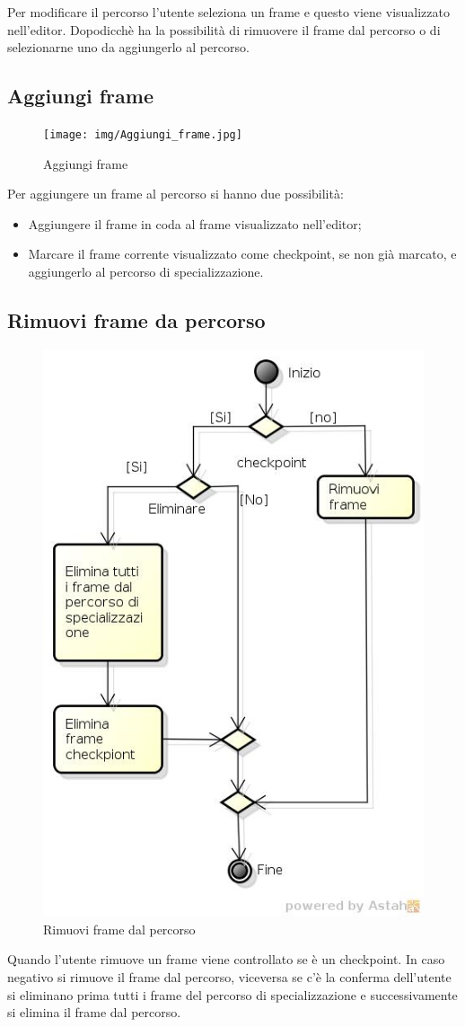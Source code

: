 Per modificare il percorso l'utente seleziona un frame e questo viene visualizzato nell'editor. Dopodicchè ha la possibilità di rimuovere il frame dal percorso o di selezionarne uno da aggiungerlo al percorso.

\subsection{Aggiungi frame}

\begin{figure}[h!]
		\centering
		\texttt{[image: img/Aggiungi\_frame.jpg]}
		\caption{Aggiungi frame}
		\label{fig:ModelloSpy}
\end{figure}

Per aggiungere un frame al percorso si hanno due possibilità:
\begin{itemize}
\item Aggiungere il frame in coda al frame visualizzato nell'editor;
\item Marcare il frame corrente visualizzato come checkpoint, se non già marcato, e aggiungerlo al percorso di specializzazione.  
\end{itemize}

\subsection{Rimuovi frame da percorso}

\begin{figure}[h!]
		\centering
		\includegraphics[scale=.2]{img/Rimuovi_frame_da_percorso.jpg}
		\caption{Rimuovi frame dal percorso}
		\label{fig:ModelloSpy}
\end{figure}

Quando l'utente rimuove un frame viene controllato se è un checkpoint. In caso negativo si rimuove il frame dal percorso, viceversa se c'è la conferma dell'utente si eliminano prima tutti i frame del percorso di specializzazione e successivamente si elimina il frame dal percorso. 
